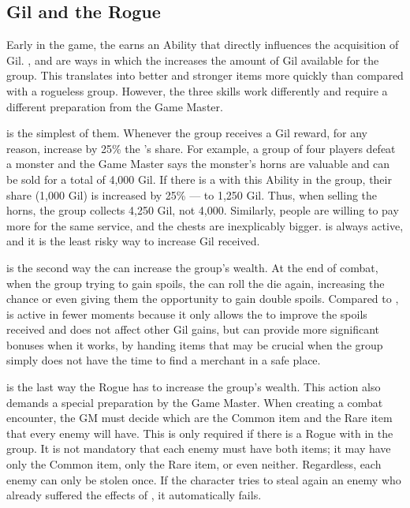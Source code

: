 \begin{multicols}{2}
\subsection{Gil and the Rogue}\label{subsec:inv-rogue}
Early in the game, the  earns an Ability that directly influences the acquisition of Gil. ,  and  are ways in which the  increases the amount of Gil available for the group. This translates into better and stronger items more quickly than compared with a rogueless group. However, the three skills work differently and require a different preparation from the Game Master.

 is the simplest of them. Whenever the group receives a Gil reward, for any reason, increase by 25\% the ’s share. For example, a group of four players defeat a monster and the Game Master says the monster’s horns are valuable and can be sold for a total of 4,000 Gil. If there is a  with this Ability in the group, their share (1,000 Gil) is increased by 25\% --- to 1,250 Gil. Thus, when selling the horns, the group collects 4,250 Gil, not 4,000. Similarly, people are willing to pay more for the same service, and the chests are inexplicably bigger.  is always active, and it is the least risky way to increase Gil received.

\begin{center}
\end{center}

 is the second way the  can increase the group’s wealth. At the end of combat, when the group trying to gain spoils, the  can roll the die again, increasing the chance or even giving them the opportunity to gain double spoils. Compared to ,  is active in fewer moments because it only allows the  to improve the spoils received and does not affect other Gil gains, but can provide more significant bonuses when it works, by handing items that may be crucial when the group simply does not have the time to find a merchant in a safe place.

 is the last way the Rogue has to increase the group’s wealth. This action also demands a special preparation by the Game Master. When creating a combat encounter, the GM must decide which are the Common item and the Rare item that every enemy will have. This is only required if there is a Rogue with  in the group. It is not mandatory that each enemy must have both items; it may have only the Common item, only the Rare item, or even neither. Regardless, each enemy can only be stolen once. If the character tries to steal again an enemy who already suffered the effects of , it automatically fails.


\end{multicols}
